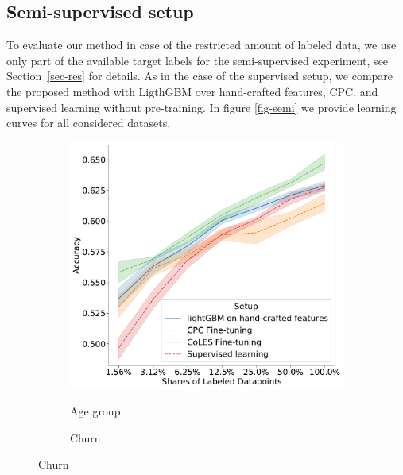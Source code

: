 \documentclass{article}
\begin{document}
\subsection{Semi-supervised setup} \label{app-sec-semi}

To evaluate our method in case of the restricted amount of labeled data, we use only part of the available target labels for the semi-supervised experiment, see Section~\ref{sec-res} for details. As in the case of the supervised setup, we compare the proposed method with LigthGBM over hand-crafted features, CPC, and supervised learning without pre-training. In figure \ref{fig-semi} we provide learning curves for all considered datasets.

\begin{figure}
  \centering
  \begin{subfigure}{0.5\linewidth}
    \caption{Age group}
    \includegraphics[width=\linewidth]{figures/ss_age_pred_per.pdf}
    \label{fig-semi-age2}
  \end{subfigure}%
  \begin{subfigure}{0.5\linewidth}
    \caption{Churn}

\end{subfigure}
\end{figure}
\end{document}
